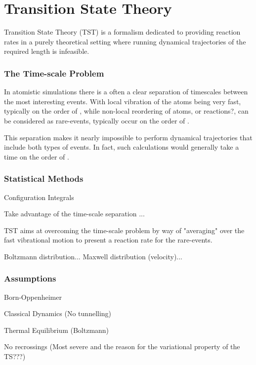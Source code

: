 \section{Transition State Theory}
\label{sec:tst}

Transition State Theory (TST) is a formalism dedicated to providing reaction rates in a purely theoretical setting where running dynamical trajectories of the required length is infeasible.

\recent

\incomplete

\subsubsection{The Time-scale Problem}
In atomistic simulations there is a often a clear separation of timescales between the most interesting events.
With local vibration of the atoms being very fast, typically on the order of \missing,
while non-local reordering of atoms, or reactions?, can be considered as rare-events, typically occur on the order of \missing.

This separation makes it nearly impossible to perform dynamical trajectories that include both types of events.
In fact, such calculations would generally take a time on the order of \missing.

\recent

\incomplete

\subsubsection{Statistical Methods}

\bit
\item Configuration Integrals
\eit

Take advantage of the time-scale separation ...

TST aims at overcoming the time-scale problem by way of "averaging" over the fast vibrational motion to present a reaction rate for the rare-events.

Boltzmann distribution...
Maxwell distribution (velocity)...

\incomplete

\subsubsection{Assumptions}
\bit
\item Born-Oppenheimer
\item Classical Dynamics (No tunnelling)
\item Thermal Equilibrium (Boltzmann)
\item No recrossings (Most severe and the reason for the variational property of the TS???)
\eit
\placeholder

